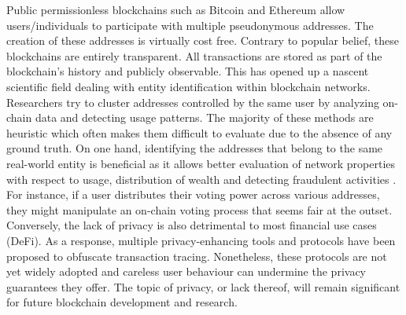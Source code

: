 \documentclass[12pt,a4paper,titlepage,oneside,english]{article}
\begin{document}
Public permissionless blockchains such as Bitcoin \citep{nakamotoBitcoin2008} and Ethereum \citep{buterin2014ethereum} allow users/individuals to participate with multiple pseudonymous addresses. The creation of these addresses is virtually cost free. Contrary to popular belief, these blockchains are entirely transparent. All transactions are stored as part of the blockchain's history and publicly observable.
This has opened up a nascent scientific field dealing with entity identification within blockchain networks. Researchers try to cluster addresses controlled by the same user by analyzing on-chain data and detecting usage patterns. The majority of these methods are heuristic which often makes them difficult to evaluate due to the absence of any ground truth. \newline
On one hand, identifying the addresses that belong to the same real-world entity is beneficial as it allows better evaluation of network properties with respect to usage, distribution of wealth and detecting fraudulent activities \citep{FV:17}. For instance, if a user distributes their voting power across various addresses, they might manipulate an on-chain voting process that seems fair at the outset. \newline
Conversely, the lack of privacy is also detrimental to most financial use cases (DeFi). As a response, multiple privacy-enhancing tools and protocols have been proposed to obfuscate transaction tracing. 
Nonetheless, these protocols are not yet widely adopted and careless user behaviour can undermine the privacy guarantees they offer. \newline
The topic of privacy, or lack thereof, will remain significant for future blockchain development and research.

\end{document}
